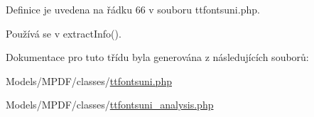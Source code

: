 Definice je uvedena na řádku 66 v souboru ttfontsuni.\-php.



Používá se v extract\-Info().



Dokumentace pro tuto třídu byla generována z následujících souborů\-:\begin{DoxyCompactItemize}
\item 
Models/\-M\-P\-D\-F/classes/\hyperlink{ttfontsuni_8php}{ttfontsuni.\-php}\item 
Models/\-M\-P\-D\-F/classes/\hyperlink{ttfontsuni__analysis_8php}{ttfontsuni\-\_\-analysis.\-php}\end{DoxyCompactItemize}
